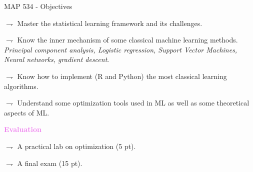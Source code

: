 \documentclass[9pt]{beamer}
\begin{document}
\begin{frame}{MAP 534 - Objectives}

$\rightharpoondown$ Master the \alert{statistical learning} framework and its challenges.

$\rightharpoondown$ Know the inner mechanism of some classical \alert{machine learning methods}.\\
{\em {\small Principal component analysis, Logistic regression, Support Vector Machines, Neural networks, gradient descent}}.

$\rightharpoondown$ Know how to implement (\alert{R and Python}) the most classical \alert{learning} algorithms.

$\rightharpoondown$ Understand some \alert{optimization} tools used in ML as well as some \alert{theoretical aspects} of ML.

\vspace{.5cm}

\textcolor{violet}{{\bf Evaluation}}

$\rightharpoondown$ A practical lab on optimization (5 pt).

$\rightharpoondown$ A final exam (15 pt).

\end{frame}
\end{document}
